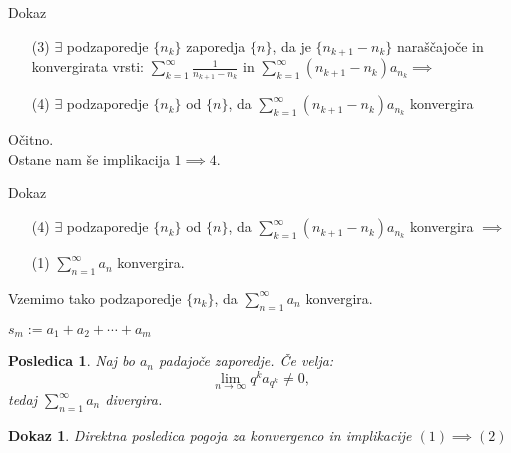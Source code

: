 \documentclass{beamer}
\newtheorem{posledica}{Posledica}
\newtheorem{dokaz}{Dokaz}
\begin{document}
\begin{frame}{Dokaz}
    \begin{block}{}
        \begin{enumerate} 
            \item[(3)] $\exists$ podzaporedje $\{n_k\}$ zaporedja $\{n\}$, da je $\{n_{k+1} - n_k\}$ 
            naraščajoče in konvergirata vrsti:
            $\sum_{k = 1}^{\infty}{\frac{1}{n_{k+1} - n_k}}$ in 
            $\sum_{k = 1}^{\infty}{(n_{k+1} - n_k)a_{n_k}} \implies$
            \item[(4)] $\exists$ podzaporedje $\{n_k\}$ od $\{n\}$, da 
            $\sum_{k = 1}^{\infty}{(n_{k+1} - n_k)a_{n_k}}$ konvergira

        \end{enumerate}
    \end{block} 
    
    \vspace{0.3cm}
    \pause
    
    Očitno.\\
    Ostane nam še implikacija $ 1 \implies 4$.
    
\end{frame}


\begin{frame}{Dokaz}
    \begin{block}{}
        \begin{enumerate}  
            \item[(4)] $\exists$ podzaporedje $\{n_k\}$ od $\{n\}$, da 
            $\sum_{k = 1}^{\infty}{(n_{k+1} - n_k)a_{n_k}}$ konvergira $\implies$
            \item[(1)] $\sum_{n = 1}^{\infty}{a_n}$ konvergira.
        \end{enumerate}
    \end{block} 
    \pause
    
    Vzemimo tako podzaporedje  $\{n_k\}$, da $\sum_{n = 1}^{\infty}{a_n}$ konvergira.
    \vspace{0.2cm}

    $s_m := a_1 + a_2 + \cdots + a_m$


\end{frame}

\begin{frame}
    \begin{posledica}
        Naj bo $a_n$ padajoče zaporedje. Če velja:
        \[
            \lim_{n \to \infty}{q^ka_{q^k}} \neq 0 \text{,} 
        \]
        tedaj $\sum_{n = 1}^{\infty}{a_n}$ divergira.
    \end{posledica}
    \pause

    \begin{dokaz}
        Direktna posledica pogoja za konvergenco in implikacije $ (1) \implies (2)$
    \end{dokaz}
    
\end{frame}
\end{document}
